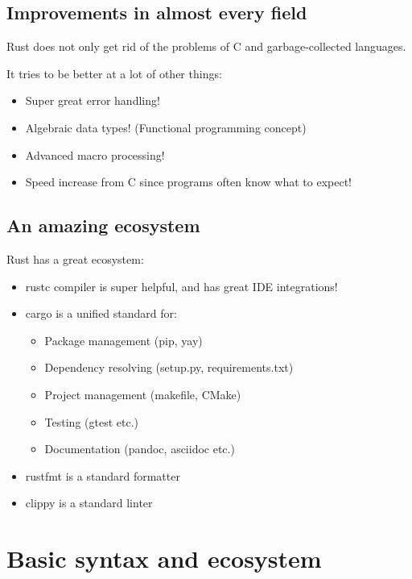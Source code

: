 \documentclass[usenames,twocolumn,dvipsnames,10pt,a4wide]{article}
\begin{document}
\subsection{Improvements in almost every field} 
Rust does not only get rid of the problems
of C and garbage-collected languages.


It tries to be better at a lot of other things:
\begin{itemize}[label=$\bullet$]
	\item Super great error handling!
	\item Algebraic data types!
		(Functional programming concept)
	\item Advanced macro processing!
	\item Speed increase from C since programs 
		often know what to expect!
\end{itemize}


\subsection{An amazing ecosystem} 


Rust has a great ecosystem:
\begin{itemize}[label=$\bullet$]
	\item rustc compiler is super helpful, and has great IDE integrations!
	\item cargo is a unified standard for:
		\begin{itemize}[label=$\bullet$]
			\item Package management (pip, yay)
			\item Dependency resolving (setup.py, requirements.txt)
			\item Project management (makefile, CMake)
			\item Testing (gtest etc.)
			\item Documentation (pandoc, asciidoc etc.)
		\end{itemize}
	\item rustfmt is a standard formatter
	\item clippy is a standard linter
\end{itemize}




\section{Basic syntax and ecosystem}
\end{document}

